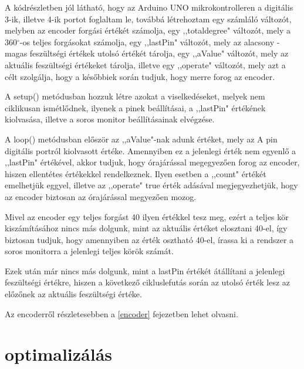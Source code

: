 \documentclass[
]{thesis-ekf}
\theoremstyle{definition}
\theoremstyle{remark}
\begin{document}
			
			\par A kódrészletben jól látható, hogy az Arduino UNO mikrokontrolleren a digitális 3-ik, illetve 4-ik portot foglaltam le, továbbá létrehoztam egy számláló változót, melyben az encoder forgási értékét számolja, egy ,,totaldegree" változót, mely a 360$^{\circ}$-os teljes forgásokat számolja, egy ,,lastPin" változót, mely az alacsony - magas feszültségi értékek utolsó értékét tárolja, egy ,,aValue" változót, mely az aktuális feszültségi értékeket tárolja, illetve egy ,,operate" változót, mely azt a célt szolgálja, hogy a későbbiek során tudjuk, hogy merre forog az encoder.
			\par A setup() metódusban hozzuk létre azokat a viselkedéseket, melyek nem ciklikusan ismétlődnek, ilyenek a pinek beállításai, a ,,lastPin" értékének kiolvasása, illetve a soros monitor beállításainak elvégzése.
			\par A loop() metódusban először az ,,aValue"-nak adunk értéket, mely az A pin digitális portról kiolvasott értéke. Amennyiben ez a jelenlegi érték nem egyenlő a ,,lastPin" értékével, akkor tudjuk, hogy órajárással megegyezően forog az encoder, hiszen ellentétes értékekkel rendelkeznek. Ilyen esetben a ,,count" értékét emelhetjük eggyel, illetve az ,,operate" true érték adásával megjegyezhetjük, hogy az encoder biztosan az órajárással megyezően mozog.
			\par Mivel az encoder egy teljes forgást 40 ilyen értékkel tesz meg, ezért a teljes kör kiszámításához nincs más dolgunk, mint az aktuális értéket elosztani 40-el, így biztosan tudjuk, hogy amennyiben az érték osztható 40-el, írassa ki a rendszer a soros monitorra a jelenlegi teljes körök számát.
			\par Ezek után már nincs más dolgunk, mint a lastPin értékét átállítani a jelenlegi feszültségi értékre, hiszen a következő cikluslefutás során az utolsó érték lesz az előzőnek az aktuális feszültségi értéke.
			\par Az encoderről részletesebben a \ref{encoder} fejezetben lehet olvasni.
			
	\section{optimalizálás}
\end{document}
